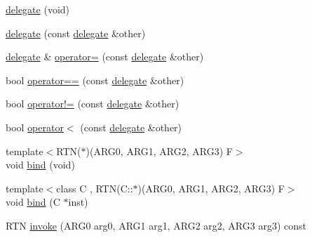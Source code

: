 \begin{DoxyCompactItemize}
\item 
\hyperlink{classcrap_1_1delegate_3_01_r_t_n_07_a_r_g0_00_01_a_r_g1_00_01_a_r_g2_00_01_a_r_g3_08_4_a69cb31c4e74db03d042296950348d319}{delegate} (void)
\item 
\hyperlink{classcrap_1_1delegate_3_01_r_t_n_07_a_r_g0_00_01_a_r_g1_00_01_a_r_g2_00_01_a_r_g3_08_4_a72af3d714928fdeb7207b2cd132a62ee}{delegate} (const \hyperlink{classcrap_1_1delegate}{delegate} \&other)
\item 
\hyperlink{classcrap_1_1delegate}{delegate} \& \hyperlink{classcrap_1_1delegate_3_01_r_t_n_07_a_r_g0_00_01_a_r_g1_00_01_a_r_g2_00_01_a_r_g3_08_4_a7985af15f5902e9a07ad942c05c94f8a}{operator=} (const \hyperlink{classcrap_1_1delegate}{delegate} \&other)
\item 
bool \hyperlink{classcrap_1_1delegate_3_01_r_t_n_07_a_r_g0_00_01_a_r_g1_00_01_a_r_g2_00_01_a_r_g3_08_4_a35baede7378f32df7636d136a3a93a3a}{operator==} (const \hyperlink{classcrap_1_1delegate}{delegate} \&other)
\item 
bool \hyperlink{classcrap_1_1delegate_3_01_r_t_n_07_a_r_g0_00_01_a_r_g1_00_01_a_r_g2_00_01_a_r_g3_08_4_ad09b357c8740d76cc7eb338f682a288b}{operator!=} (const \hyperlink{classcrap_1_1delegate}{delegate} \&other)
\item 
bool \hyperlink{classcrap_1_1delegate_3_01_r_t_n_07_a_r_g0_00_01_a_r_g1_00_01_a_r_g2_00_01_a_r_g3_08_4_aab2d7d95f63d65d30a0c3da56a306689}{operator$<$} (const \hyperlink{classcrap_1_1delegate}{delegate} \&other)
\item 
{\footnotesize template$<$R\+T\+N($\ast$)(\+A\+R\+G0, A\+R\+G1, A\+R\+G2, A\+R\+G3) F$>$ }\\void \hyperlink{classcrap_1_1delegate_3_01_r_t_n_07_a_r_g0_00_01_a_r_g1_00_01_a_r_g2_00_01_a_r_g3_08_4_a5fbc70da885cd9931f0e30ed9e3a3ff8}{bind} (void)
\item 
{\footnotesize template$<$class C , R\+T\+N(\+C\+::$\ast$)(\+A\+R\+G0, A\+R\+G1, A\+R\+G2, A\+R\+G3) F$>$ }\\void \hyperlink{classcrap_1_1delegate_3_01_r_t_n_07_a_r_g0_00_01_a_r_g1_00_01_a_r_g2_00_01_a_r_g3_08_4_a11e07c417d3b08651f9826ea9135bdc0}{bind} (C $\ast$inst)
\item 
R\+T\+N \hyperlink{classcrap_1_1delegate_3_01_r_t_n_07_a_r_g0_00_01_a_r_g1_00_01_a_r_g2_00_01_a_r_g3_08_4_aa48fe70ba4dfb3161de0dbc27092125f}{invoke} (A\+R\+G0 arg0, A\+R\+G1 arg1, A\+R\+G2 arg2, A\+R\+G3 arg3) const 
\end{DoxyCompactItemize}


